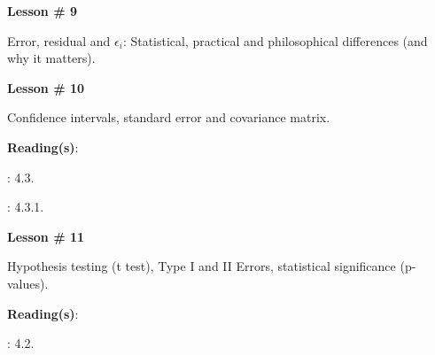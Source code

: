 \documentclass[letterpaper]{article}
\renewenvironment{itemize}{
  \begin{list}{}{
    \setlength{\leftmargin}{1.5em}
  }
}{
  \end{list}
}
\begin{document}
\begin{enumerate}
			\begin{itemize} 
				\item[$\bullet$] {\bf Lesson \# 9} %
					\begin{itemize} 
						\item[$\circ$] Error, residual and $\epsilon_{i}$: Statistical, practical and philosophical differences (and why it matters).
					\end{itemize}
			\end{itemize}


			\begin{itemize} 
				\item[$\bullet$] {\bf Lesson \# 10} %
					\begin{itemize} 
						\item[$\circ$] Confidence intervals, standard error and covariance matrix. %
						\item[$\circ$] {\bf Reading(s)}: 
							\begin{itemize}
								\item[$\diamond$] \textcite{Wooldridge2002}: 4.3.
                \item[$\diamond$] \textcite{Fox:2010vc}: 4.3.1.
							\end{itemize}
					\end{itemize}
			\end{itemize}



			\begin{itemize} 
				\item[$\bullet$] {\bf Lesson \# 11} %
					\begin{itemize} 
						\item[$\circ$] Hypothesis testing (t test), Type I and II Errors, statistical significance (p-values). 
						\item[$\circ$] {\bf Reading(s)}: 
							\begin{itemize}
								\item[$\diamond$] \textcite{Wooldridge2002}: 4.2.
							\end{itemize}
					\end{itemize}
			\end{itemize}




\end{enumerate}
\end{document}
